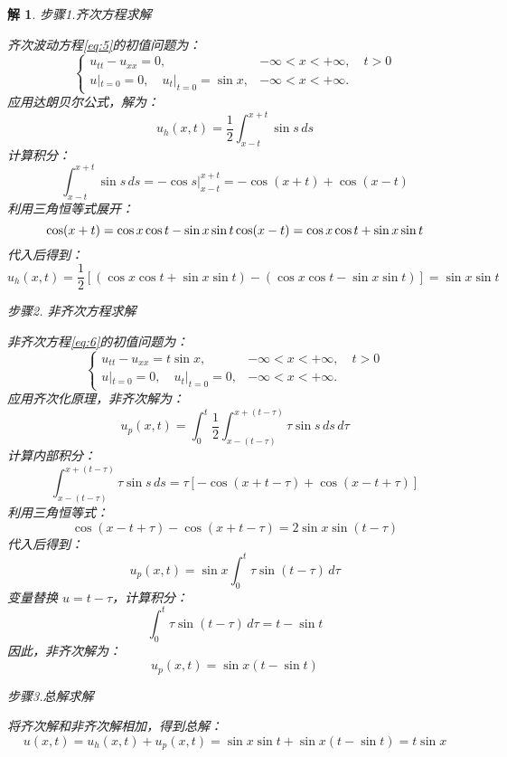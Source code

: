 \documentclass[12pt,a4paper]{article}
\newtheorem*{solution}{解}
\begin{document}
\begin{solution}
步骤1.齐次方程求解
	
	\noindent
	齐次波动方程\eqref{eq:5}的初值问题为：
	\begin{equation}\label{eq:5}
		\begin{cases}
			u_{tt} - u_{xx} = 0, & -\infty < x < +\infty, \quad t > 0 \\
			u|_{t=0} = 0, \quad u_t|_{t=0} = \sin x, & -\infty < x < +\infty.
		\end{cases}
	\end{equation}
	应用达朗贝尔公式，解为：
	\[
	u_h(x, t) = \frac{1}{2} \int_{x - t}^{x + t} \sin s \, ds
	\]
	计算积分：
	\[
	\int_{x - t}^{x + t} \sin s \, ds = -\cos s \Big|_{x - t}^{x + t} = -\cos(x + t) + \cos(x - t)
	\]
	利用三角恒等式展开：
	\[
	\cos(x + t) = \cos x \cos t - \sin x \sin t \\
	\cos(x - t) = \cos x \cos t + \sin x \sin t
	\]
	代入后得到：
	\[
	u_h(x, t) = \frac{1}{2} \left[ (\cos x \cos t + \sin x \sin t) - (\cos x \cos t - \sin x \sin t) \right] = \sin x \sin t
	\]
	
	步骤2. 非齐次方程求解
	
	\noindent
	非齐次方程\eqref{eq:6}的初值问题为：
	\begin{equation}\label{eq:6}
		\begin{cases}
			u_{tt} - u_{xx} = t \sin x, & -\infty < x < +\infty, \quad t > 0 \\
			u|_{t=0} = 0, \quad u_t|_{t=0} = 0, & -\infty < x < +\infty.
		\end{cases}
	\end{equation}
	应用齐次化原理，非齐次解为：
	\[
	u_p(x, t) = \int_0^t \frac{1}{2} \int_{x - (t - \tau)}^{x + (t - \tau)} \tau \sin s \, ds \, d\tau
	\]
	计算内部积分：
	\[
	\int_{x - (t - \tau)}^{x + (t - \tau)} \tau \sin s \, ds = \tau \left[ -\cos(x + t - \tau) + \cos(x - t + \tau) \right]
	\]
	利用三角恒等式：
	\[
	\cos(x - t + \tau) - \cos(x + t - \tau) = 2 \sin x \sin(t - \tau)
	\]
	代入后得到：
	\[
	u_p(x, t) = \sin x \int_0^t \tau \sin(t - \tau) \, d\tau
	\]
	变量替换 \(u = t - \tau\)，计算积分：
	\[
	\int_0^t \tau \sin(t - \tau) \, d\tau = t - \sin t
	\]
	因此，非齐次解为：
	\[
	u_p(x, t) = \sin x (t - \sin t)
	\]
	
	步骤3.总解求解
	
	\noindent
	将齐次解和非齐次解相加，得到总解：
	\[
	u(x, t) = u_h(x, t) + u_p(x, t) = \sin x \sin t + \sin x (t - \sin t) = t \sin x
	\]
	
	
\end{solution}
\end{document}
